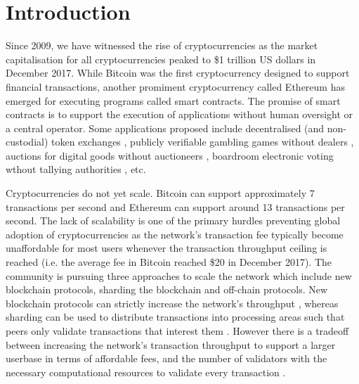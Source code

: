 \documentclass{llncs}
\begin{document}
\section{Introduction}

Since 2009, we have witnessed the rise of cryptocurrencies as the market capitalisation for all cryptocurrencies peaked to \$1 trillion US dollars in December 2017.
While Bitcoin \cite{nakamoto2008bitcoin} was the first cryptocurrency designed to support financial transactions, another promiment cryptocurrency called Ethereum \cite{wood2014ethereum} has emerged for executing programs called smart contracts. 
The promise of smart contracts is to support the execution of applications without human oversight or a central operator. 
Some applications proposed include decentralised (and non-custodial) token exchanges \cite{luukybernetwork}, publicly verifiable gambling games without dealers \cite{funfair}, auctions for digital goods without auctioneers \cite{auctions}, boardroom electronic voting wthout tallying authorities \cite{mccorry2017smart}, etc. 

Cryptocurrencies do not yet scale. 
Bitcoin can support approximately 7 transactions per second and Ethereum can support around 13 transactions per second. 
The lack of scalability is one of the primary hurdles preventing global adoption of cryptocurrencies as the network's transaction fee typically become unaffordable  for most users whenever the transaction throughput ceiling is reached (i.e. the average fee in Bitcoin reached \$20 in December 2017).
The community is pursuing three approaches to scale the network which include new blockchain protocols, sharding the blockchain and off-chain protocols. 
New blockchain protocols can strictly increase the network's throughput \cite{sompolinsky2016spectre,eyal2016bitcoin,sompolinsky2015secure}, whereas sharding can be used to distribute transactions into processing areas such that peers only validate transactions that interest them \cite{kokoris2018omniledger,al2017chainspace,luu2016secure}. 
However there is a tradeoff between increasing the network's transaction throughput to support a larger userbase in terms of affordable fees, and the number of validators with the necessary computational resources to validate every transaction \cite{mccorry2017atomically,gervais2016security,croman2016scaling}.
\end{document}
